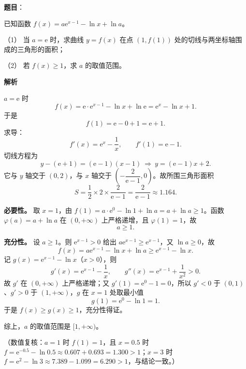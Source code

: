 \begin{answer}

\textbf{题目}：

已知函数 $f(x)=a\mathrm e^{x-1}-\ln x+\ln a$。

（1） 当 $a=\mathrm e$ 时，求曲线 $y=f(x)$ 在点 $(1,f(1))$ 处的切线与两坐标轴围成的三角形的面积；

（2） 若 $f(x)\geqslant1$，求 $a$ 的取值范围。

\textbf{解析}


$a=\mathrm e$ 时
\nopagebreak[4]
\[f(x)=\mathrm e\cdot\mathrm e^{x-1}-\ln x+\ln\mathrm e=\mathrm e^x-\ln x+1 .\]
于是
\nopagebreak[4]
\[f(1)=\mathrm e-0+1=\mathrm e+1 .\]
求导：
\nopagebreak[4]
\[f'(x)=\mathrm e^x-\frac1x,\qquad f'(1)=\mathrm e-1 .\]
切线方程为
\nopagebreak[4]
\[y-(\mathrm e+1)=(\mathrm e-1)(x-1)\ \Longrightarrow\ y=(\mathrm e-1)x+2 .\]
它与 $y$ 轴交于 $(0,2)$，与 $x$ 轴交于 $\left(-\dfrac2{\mathrm e-1},0\right)$。故所围三角形面积
\nopagebreak[4]
\[S=\frac12\times2\times\frac2{\mathrm e-1}=\frac2{\mathrm e-1}\approx1.164 .\]


\textbf{必要性。} 取 $x=1$，由 $f(1)=a\cdot\mathrm e^0-\ln1+\ln a=a+\ln a\geqslant1$。函数 $\varphi(a)=a+\ln a$ 在 $(0,+\infty)$ 上严格递增，且 $\varphi(1)=1$，故
\nopagebreak[4]
\[a\geqslant1 .\]

\textbf{充分性。} 设 $a\geqslant1$。则 $\mathrm e^{x-1}>0$ 给出 $a\mathrm e^{x-1}\geqslant\mathrm e^{x-1}$，又 $\ln a\geqslant0$，故
\nopagebreak[4]
\[f(x)=a\mathrm e^{x-1}-\ln x+\ln a\geqslant\mathrm e^{x-1}-\ln x .\]
记 $g(x)=\mathrm e^{x-1}-\ln x$（$x>0$），则
\nopagebreak[4]
\[g'(x)=\mathrm e^{x-1}-\frac1x,\qquad g''(x)=\mathrm e^{x-1}+\frac1{x^2}>0 .\]
故 $g'$ 在 $(0,+\infty)$ 上严格递增；又 $g'(1)=\mathrm e^0-1=0$，所以 $g'<0$ 于 $(0,1)$、$g'>0$ 于 $(1,+\infty)$，$g$ 在 $x=1$ 处取最小值
\nopagebreak[4]
\[g(1)=\mathrm e^0-\ln1=1 .\]
于是 $f(x)\geqslant g(x)\geqslant1$，充分性得证。

综上，$a$ 的取值范围是 $[1,+\infty)$。

（数值复核：$a=1$ 时 $f(1)=1$，且 $x=0.5$ 时 $f=\mathrm e^{-0.5}-\ln0.5\approx0.607+0.693=1.300>1$；$x=3$ 时 $f=\mathrm e^2-\ln3\approx7.389-1.099=6.290>1$，与结论一致。）


\gkanswer{答案（2）：$[1,+\infty)$。取 $x=1$ 得必要条件 $a+\ln a\geqslant1$，故 $a\geqslant1$；反之 $a\geqslant1$ 时 $f(x)\geqslant\mathrm e^{x-1}-\ln x\geqslant1$（后者在 $x=1$ 取最小值 $1$）。}

\end{answer}
